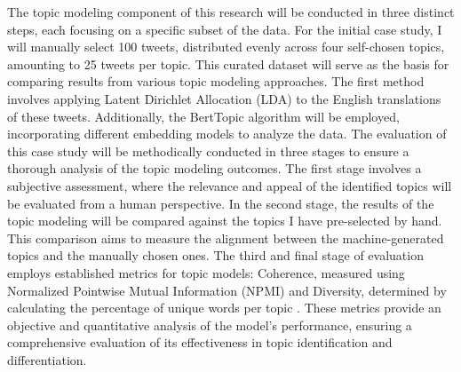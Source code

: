 \documentclass[
    11pt,
    a4paper,
    egregdoesnotlikesansseriftitles,
    toc=chapterentrywithdots,
    oneside,openright,
    titlepage,
    parskip=half,
    headings=normal,  %
    listof=totoc,
    bibliography=totoc,
    index=totoc,
    captions=tableheading,  %
    chapterprefix,
    listof=flat,
    final
]{scrbook}
\begin{document}
The topic modeling component of this research will be conducted in three distinct steps, each focusing on a specific subset of the data. For the initial case study, I will manually select 100 tweets, distributed evenly across four self-chosen topics, amounting to 25 tweets per topic. This curated dataset will serve as the basis for comparing results from various topic modeling approaches. The first method involves applying Latent Dirichlet Allocation (LDA) \cite{LDA} to the English translations of these tweets. Additionally, the BertTopic \cite{BERTopic} algorithm will be employed, incorporating different embedding models to analyze the data.
The evaluation of this case study will be methodically conducted in three stages to ensure a thorough analysis of the topic modeling outcomes. The first stage involves a subjective assessment, where the relevance and appeal of the identified topics will be evaluated from a human perspective. In the second stage, the results of the topic modeling will be compared against the topics I have pre-selected by hand. This comparison aims to measure the alignment between the machine-generated topics and the manually chosen ones. The third and final stage of evaluation employs established metrics for topic models: Coherence, measured using Normalized Pointwise Mutual Information (NPMI)\cite{npmi} and Diversity, determined by calculating the percentage of unique words per topic \cite{diversity}. These metrics provide an objective and quantitative analysis of the model's performance, ensuring a comprehensive evaluation of its effectiveness in topic identification and differentiation.
\backmatter

\cleardoublepage



\printnoidxglossaries
  \renewcommand\bibname{Literaturverzeichnis} 


\end{document}
